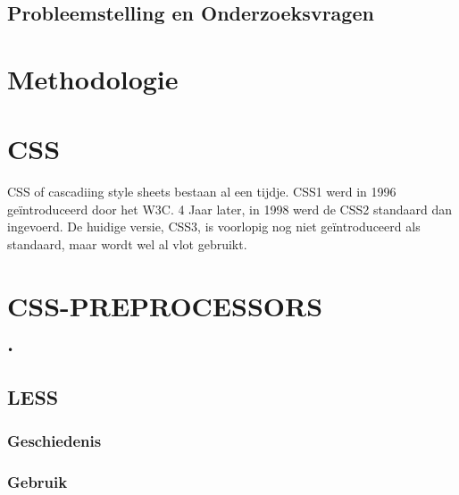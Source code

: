 \documentclass[pdftex,a4paper,12pt,twoside]{report}
\begin{document}
\section{Probleemstelling en Onderzoeksvragen}
\label{sec:onderzoeksvragen}

\lipsum[7-20]

\chapter{Methodologie}
\label{ch:methodologie}

\lipsum[21-25]

\chapter{CSS}
\label{ch:CSS}
CSS of cascadiing style sheets bestaan al een tijdje.
CSS1 werd in 1996 geïntroduceerd door het W3C. 4 Jaar later, in 1998 werd de CSS2 standaard dan ingevoerd.
De huidige versie, CSS3, is voorlopig nog niet geïntroduceerd als standaard, maar wordt wel al vlot gebruikt.


\chapter{CSS-PREPROCESSORS}\texttt{•}
\label{ch:css-preprocessors}

\section{LESS}
\subsection{Geschiedenis}
\subsection{Gebruik}
\end{document}

